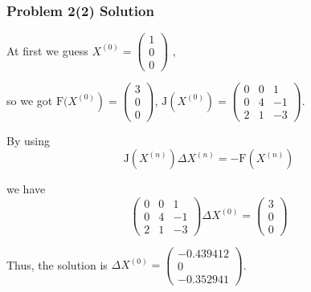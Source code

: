 \documentclass{beamer}
\begin{document}
\begin{frame}
\frametitle{Problem 2(2) Solution}
At first we guess  $X^{(0)}=\left(\begin{array}{l}1 \\ 0 \\ 0\end{array}\right)$ , 

so we got  $\left.\mathrm{F}(X^{(0)}\right)=\left(\begin{array}{l}3 \\ 0 \\ 0\end{array}\right)$, $\mathrm{J}\left(X^{(0)}\right)=\left(\begin{array}{ccc}
0 & 0 & 1 \\
0 & 4 & -1 \\
2 & 1 & -3
\end{array}\right)$. 

By using  \begin{equation}\mathrm{J}\left(X^{(n)}\right) \Delta X^{(n)}=-\mathrm{F}\left(X^{(n)}\right)\end{equation}

we have  \begin{equation}\left(\begin{array}{ccc}0 & 0 & 1 \\ 0 & 4 & -1 \\ 2 & 1 & -3\end{array}\right) \Delta X^{(0)}=\left(\begin{array}{l}3 \\ 0 \\ 0\end{array}\right)\end{equation}

Thus, the solution is  $\Delta X^{(0)}=\left(\begin{array}{c}-0.439412 \\ 0 \\ -0.352941\end{array}\right) $.

\end{frame}
\end{document}
